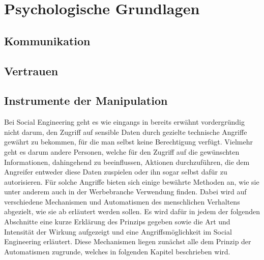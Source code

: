 \section{Psychologische Grundlagen}\label{sec:psychologische_grundlagen}

\subsection{Kommunikation}

\subsection{Vertrauen}

\subsection{Instrumente der Manipulation}\label{sec:instrumente_der_manipulation}
Bei Social Engineering geht es wie eingangs in  bereits erwähnt vordergründig
nicht darum, den Zugriff auf sensible Daten durch gezielte technische Angriffe gewährt zu bekommen,
für die man selbst keine Berechtigung verfügt.
Vielmehr geht es darum andere Personen, welche für den Zugriff auf die gewünschten Informationen, dahingehend
zu beeinflussen, Aktionen durchzuführen, die dem Angreifer entweder diese Daten zuspielen oder ihn sogar selbst
dafür zu autorisieren.
Für solche Angriffe bieten sich einige bewährte Methoden an, wie sie unter anderem auch in der Werbebranche
Verwendung finden.
Dabei wird auf verschiedene Mechanismen und Automatismen des menschlichen Verhaltens abgezielt, wie sie ab  erläutert werden sollen.
Es wird dafür in jedem der folgenden Abschnitte eine kurze Erklärung des Prinzips gegeben sowie die Art und
Intensität der Wirkung aufgezeigt und eine Angriffsmöglichkeit im Social Engineering erläutert.
Diese Mechanismen liegen zunächst alle dem Prinzip der Automatismen zugrunde, welches in folgenden Kapitel beschrieben wird.

